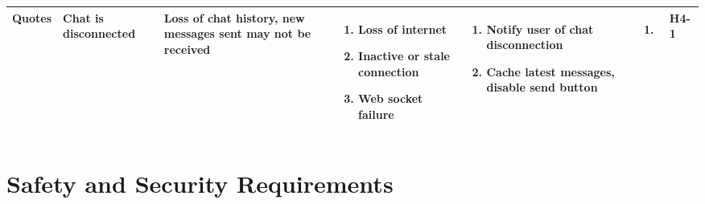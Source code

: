 \documentclass{article}
\begin{document}
\begin{landscape}
\begin{longtable}{|p{}|p{}|p{}|p{}|p{}|p{}|p{}|}
		\hline
		Quotes
		 & Chat is disconnected
		 & Loss of chat history, new messages sent may not be received
		 & \begin{enumerate}[label=\alph*., leftmargin=*]
			   \item Loss of internet
			   \item Inactive or stale connection
			   \item Web socket failure
		   \end{enumerate}
		 & \begin{enumerate}[label=\alph*., leftmargin=*]
			   \item Notify user of chat disconnection
			   \item Cache latest messages, disable send button
		   \end{enumerate}
		 & \begin{enumerate}[label=\alph*., leftmargin=*]
			   \item
		   \end{enumerate}
		 & H4-1                                                                                              \\
		\hline
	\end{longtable}
\end{landscape}

\section{Safety and Security Requirements}
\end{document}
